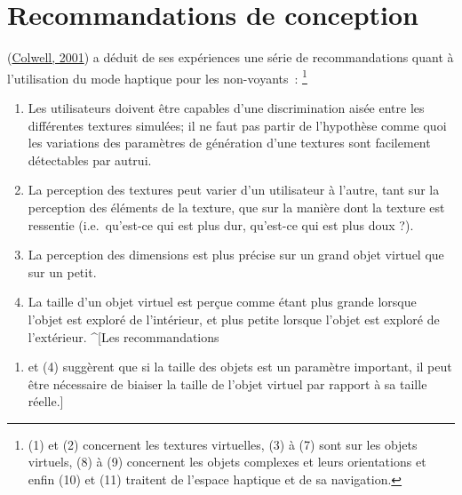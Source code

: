 \documentclass[
]{book}
\providecommand{\tightlist}{%
  \setlength{\itemsep}{0pt}\setlength{\parskip}{0pt}}
\begin{document}
\hypertarget{recommandations-de-conception}{%
\section{Recommandations de conception}\label{recommandations-de-conception}}

(\protect\hyperlink{ref-colwell2001non}{Colwell, 2001}) a déduit de ses
expériences une série de recommandations quant à l'utilisation du mode
haptique pour les non-voyants~: \footnote{(1) et (2) concernent les textures virtuelles,
  (3) à (7) sont sur les objets virtuels, (8) à (9) concernent les objets
  complexes et leurs orientations et enfin (10) et (11) traitent de l'espace
  haptique et de sa navigation.}

\begin{enumerate}
\def\labelenumi{\arabic{enumi}.}
\tightlist
\item
  Les utilisateurs doivent être capables d'une
  discrimination aisée entre les différentes textures simulées; il ne faut
  pas partir de l'hypothèse comme quoi les variations des paramètres de
  génération d'une textures sont facilement détectables par autrui.
\item
  La perception des textures peut varier d'un
  utilisateur à l'autre, tant sur la perception des éléments de la texture,
  que sur la manière dont la texture est ressentie (i.e.~qu'est-ce qui est
  plus dur, qu'est-ce qui est plus doux ?).
\item
  La perception des dimensions est plus précise sur
  un grand objet virtuel que sur un petit.
\item
  La taille d'un objet virtuel est perçue comme
  étant plus grande lorsque l'objet est exploré de l'intérieur, et plus
  petite lorsque l'objet est exploré de l'extérieur. \^{}{[}Les recommandations
\end{enumerate}

\begin{enumerate}
\def\labelenumi{(\arabic{enumi})}
\setcounter{enumi}{2}
\tightlist
\item
  et (4) suggèrent que si la taille des objets est un paramètre important,
  il peut être nécessaire de biaiser la taille de l'objet virtuel par rapport
  à sa taille réelle.{]}
\end{enumerate}
\end{document}
